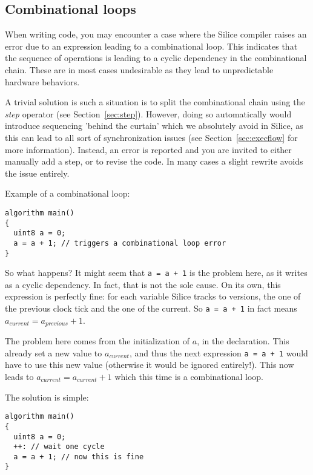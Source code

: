 \documentclass[a4]{article}
\newcommand\silice{Silice}
\begin{document}
\subsection{Combinational loops}

When writing code, you may encounter a case where the \silice{} compiler
raises an error due to an expression leading to a combinational loop. This
indicates that the sequence of operations is leading to a cyclic dependency
in the combinational chain. These are in most
cases undesirable as they lead to unpredictable hardware behaviors.

A trivial solution is such a situation is to split the combinational chain
using the \textit{step} operator (see Section~\ref{sec:step}). However,
doing so automatically would introduce sequencing 'behind the curtain'
which we absolutely avoid in \silice{}, as this can lead to all sort of synchronization issues (see Section~\ref{sec:execflow} for more information). 
Instead, an error is reported and you are invited to either manually add
a step, or to revise the code. In many cases a slight rewrite avoids the
issue entirely.

\vspace*{2mm}
\noindent Example of a combinational loop:
\begin{verbatim}
algorithm main()
{
  uint8 a = 0;
  a = a + 1; // triggers a combinational loop error
}
\end{verbatim}

So what happens? It might seem that \texttt{a = a + 1} is the problem here, as it writes as a cyclic dependency. In fact, that is not the sole cause. On its own, this expression is perfectly fine: for each variable \silice{} tracks to versions, the one of the previous clock tick and the one of the current. So \texttt{a = a + 1} in fact means $a_{current} = a_{previous} + 1$.

The problem here comes from the initialization of $a$, in the declaration. This already set a new value to $a_{current}$, and thus the next expression \texttt{a = a + 1} would have to use this new value (otherwise it would be ignored entirely!). This now leads to $a_{current} = a_{current} + 1$ which this time is a combinational loop.

\vspace*{2mm}
\noindent The solution is simple:
\begin{verbatim}
algorithm main()
{
  uint8 a = 0;
  ++: // wait one cycle
  a = a + 1; // now this is fine
}
\end{verbatim}
\end{document}
